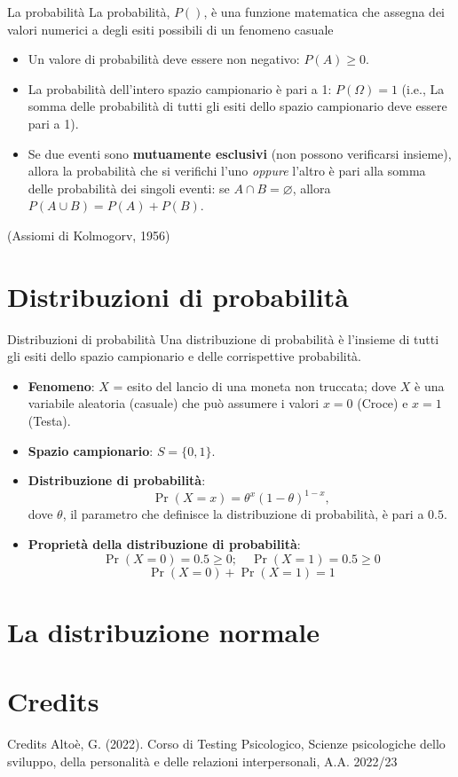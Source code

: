 \documentclass[
  ignorenonframetext,
  compress, aspectratio=149]{beamer}
\providecommand{\tightlist}{%
  \setlength{\itemsep}{0pt}\setlength{\parskip}{0pt}}
\begin{document}
\begin{frame}{La probabilità}
La probabilità, \(P()\), è una funzione matematica che assegna dei
valori numerici a degli esiti possibili di un fenomeno casuale

\begin{itemize}
\tightlist
\item
  Un valore di probabilità deve essere non negativo: \(P(A) \ge 0\).
\item
  La probabilità dell'intero spazio campionario è pari a 1:
  \(P(\Omega)=1\) (i.e., La somma delle probabilità di tutti gli esiti
  dello spazio campionario deve essere pari a 1).
\item
  Se due eventi sono \textbf{mutuamente esclusivi} (non possono
  verificarsi insieme), allora la probabilità che si verifichi l'uno
  \emph{oppure} l'altro è pari alla somma delle probabilità dei singoli
  eventi: se \(A \cap B = \varnothing\), allora
  \(P(A \cup B)=P(A)+P(B)\).
\end{itemize}

(Assiomi di Kolmogorv, 1956)
\end{frame}

\section{Distribuzioni di
probabilità}\label{distribuzioni-di-probabilituxe0}

\begin{frame}{Distribuzioni di probabilità}
Una distribuzione di probabilità è l'insieme di tutti gli esiti dello
spazio campionario e delle corrispettive probabilità.

\begin{itemize}
\item
  \textbf{Fenomeno}: \(X\) = esito del lancio di una moneta non
  truccata; dove \(X\) è una variabile aleatoria (casuale) che può
  assumere i valori \(x = 0\) (Croce) e \(x = 1\) (Testa).
\item
  \textbf{Spazio campionario}: \(S = \{0, 1\}\).
\item
  \textbf{Distribuzione di probabilità}: \[
  \Pr(X = x) = \theta^{x}(1-\theta)^{1-x},
  \] dove \(\theta\), il parametro che definisce la distribuzione di
  probabilità, è pari a \(0.5\).
\item
  \textbf{Proprietà della distribuzione di probabilità}: \[
  \Pr(X = 0) = 0.5 \ge 0;\quad \Pr(X = 1) = 0.5 \ge 0
  \] \[
  \Pr(X = 0) + \Pr(X = 1) = 1
  \]
\end{itemize}
\end{frame}

\section{La distribuzione normale}\label{la-distribuzione-normale}

\section{Credits}\label{credits}

\begin{frame}{Credits}
Altoè, G. (2022). Corso di Testing Psicologico, Scienze psicologiche
dello sviluppo, della personalità e delle relazioni interpersonali, A.A.
2022/23
\end{frame}
\end{document}
